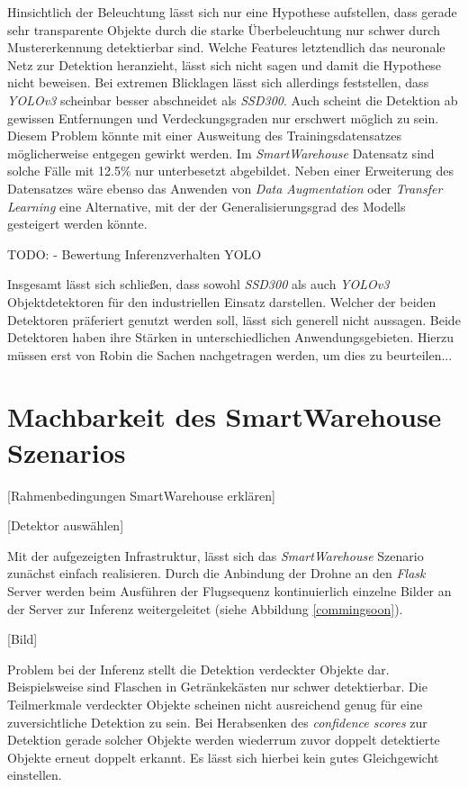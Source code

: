 Hinsichtlich der Beleuchtung lässt sich nur eine Hypothese aufstellen, dass gerade sehr transparente Objekte durch die starke Überbeleuchtung nur schwer durch Mustererkennung detektierbar sind. Welche Features letztendlich das neuronale Netz zur Detektion heranzieht, lässt sich nicht sagen und damit die Hypothese nicht beweisen. Bei extremen Blicklagen lässt sich allerdings feststellen, dass \textit{YOLOv3} scheinbar besser abschneidet als \textit{SSD300}. Auch scheint die Detektion ab gewissen Entfernungen und Verdeckungsgraden nur erschwert möglich zu sein. Diesem Problem könnte mit einer Ausweitung des Trainingsdatensatzes möglicherweise entgegen gewirkt werden. Im \textit{SmartWarehouse} Datensatz sind solche Fälle mit 12.5\% nur unterbesetzt abgebildet. Neben einer Erweiterung des Datensatzes wäre ebenso das Anwenden von \textit{Data Augmentation} oder \textit{Transfer Learning} eine Alternative, mit der der Generalisierungsgrad des Modells gesteigert werden könnte.

TODO:
- Bewertung Inferenzverhalten YOLO

Insgesamt lässt sich schließen, dass sowohl \textit{SSD300} als auch \textit{YOLOv3} Objektdetektoren für den industriellen Einsatz darstellen. Welcher der beiden Detektoren präferiert genutzt werden soll, lässt sich generell nicht aussagen. Beide Detektoren haben ihre Stärken in unterschiedlichen Anwendungsgebieten. Hierzu müssen erst von Robin die Sachen nachgetragen werden, um dies zu beurteilen...

\section{Machbarkeit des SmartWarehouse Szenarios}

[Rahmenbedingungen SmartWarehouse erklären]

[Detektor auswählen]

Mit der aufgezeigten Infrastruktur, lässt sich das \textit{SmartWarehouse} Szenario zunächst einfach realisieren. Durch die Anbindung der Drohne an den \textit{Flask} Server werden beim Ausführen der Flugsequenz kontinuierlich einzelne Bilder an der Server zur Inferenz weitergeleitet (siehe Abbildung \ref{commingsoon}). 

[Bild]

Problem bei der Inferenz stellt die Detektion verdeckter Objekte dar. Beispielsweise sind Flaschen in Getränkekästen nur schwer detektierbar. Die Teilmerkmale verdeckter Objekte scheinen nicht ausreichend genug für eine zuversichtliche Detektion zu sein. Bei Herabsenken des \textit{confidence scores} zur Detektion gerade solcher Objekte werden wiederrum zuvor doppelt detektierte Objekte erneut doppelt erkannt. Es lässt sich hierbei kein gutes Gleichgewicht einstellen. 

